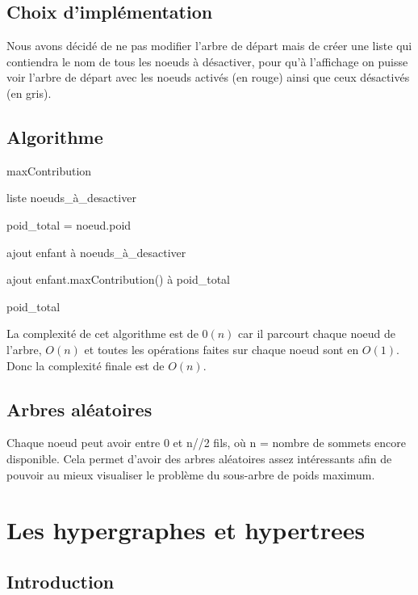 \documentclass{article}
\begin{document}
	\subsection{Choix d'implémentation}

	Nous avons décidé de ne pas modifier l'arbre de départ mais de créer une liste qui contiendra le nom de tous les noeuds à désactiver, pour qu'à l'affichage on puisse voir l'arbre de départ avec les noeuds activés (en rouge) ainsi que ceux désactivés (en gris).
	
	
	\subsection{Algorithme}
	\begin{algorithm}[H]
	\caption{maxContribution}
	\begin{algorithmic}[1]
	\REQUIRE liste noeuds\_à\_desactiver

	\STATE poid\_total = noeud.poid
	
	
	\STATE ajout enfant à noeuds\_à\_desactiver

	\ELSE
	\STATE ajout enfant.maxContribution() à poid\_total
	
	\ENDIF	
	\ENDFOR

	\RETURN poid\_total

	\end{algorithmic}
	\end{algorithm}
	
	La complexité de cet algorithme est de $0(n)$ car il parcourt chaque noeud de l'arbre, $O(n)$ et toutes les opérations faites sur chaque noeud sont en $O(1)$. Donc la complexité finale est de $O(n)$.
		
	\subsection{Arbres aléatoires}
	Chaque noeud peut avoir entre 0 et n//2 fils, où n = nombre de sommets encore disponible. Cela permet d'avoir des arbres aléatoires assez intéressants afin de pouvoir au mieux visualiser le problème du sous-arbre de poids maximum.

\section{Les hypergraphes et hypertrees}

	
	\subsection{Introduction}
	
\end{document}
